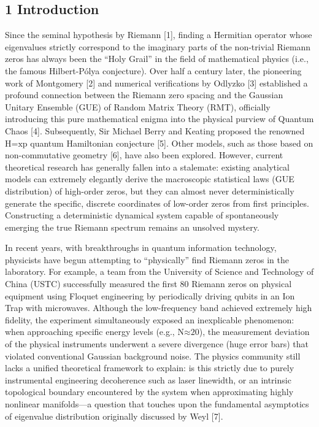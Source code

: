 \hypertarget{introduction}{%
\subsection{\texorpdfstring{\textbf{1
Introduction}}{1 Introduction}}\label{introduction}}

Since the seminal hypothesis by Riemann {[}1{]}, finding a Hermitian
operator whose eigenvalues strictly correspond to the imaginary parts of
the non-trivial Riemann zeros has always been the ``Holy Grail'' in the
field of mathematical physics (i.e., the famous Hilbert-Pólya
conjecture). Over half a century later, the pioneering work of
Montgomery {[}2{]} and numerical verifications by Odlyzko {[}3{]}
established a profound connection between the Riemann zero spacing and
the Gaussian Unitary Ensemble (GUE) of Random Matrix Theory (RMT),
officially introducing this pure mathematical enigma into the physical
purview of Quantum Chaos {[}4{]}. Subsequently, Sir Michael Berry and
Keating proposed the renowned \(\text{H}\text{=}\text{xp}\) quantum
Hamiltonian conjecture {[}5{]}. Other models, such as those based on
non-commutative geometry {[}6{]}, have also been explored. However,
current theoretical research has generally fallen into a stalemate:
existing analytical models can extremely elegantly derive the
macroscopic statistical laws (GUE distribution) of high-order zeros, but
they can almost never deterministically generate the specific, discrete
coordinates of low-order zeros from first principles. Constructing a
deterministic dynamical system capable of spontaneously emerging the
true Riemann spectrum remains an unsolved mystery.

In recent years, with breakthroughs in quantum information technology,
physicists have begun attempting to ``physically'' find Riemann zeros in
the laboratory. For example, a team from the University of Science and
Technology of China (USTC) successfully measured the first 80 Riemann
zeros on physical equipment using Floquet engineering by periodically
driving qubits in an Ion Trap with microwaves. Although the
low-frequency band achieved extremely high fidelity, the experiment
simultaneously exposed an inexplicable phenomenon: when approaching
specific energy levels (e.g., \(\text{N}\text{≈20}\)), the measurement
deviation of the physical instruments underwent a severe divergence
(huge error bars) that violated conventional Gaussian background noise.
The physics community still lacks a unified theoretical framework to
explain: is this strictly due to purely instrumental engineering
decoherence such as laser linewidth, or an intrinsic topological
boundary encountered by the system when approximating highly nonlinear
manifolds---a question that touches upon the fundamental asymptotics of
eigenvalue distribution originally discussed by Weyl {[}7{]}.

